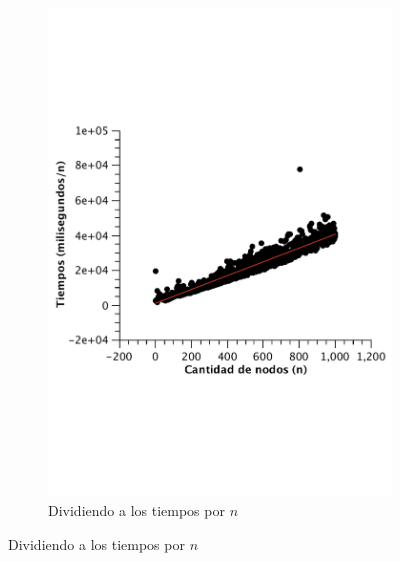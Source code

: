 \begin{figure}[H]
        \begin{subfigure}[b]{0.5\textwidth}
                \includegraphics[width=\textwidth]{imagenes/vacio-matriz-2.pdf}
                \caption{Dividiendo a los tiempos por $n$}
        \end{subfigure}



\end{figure}


